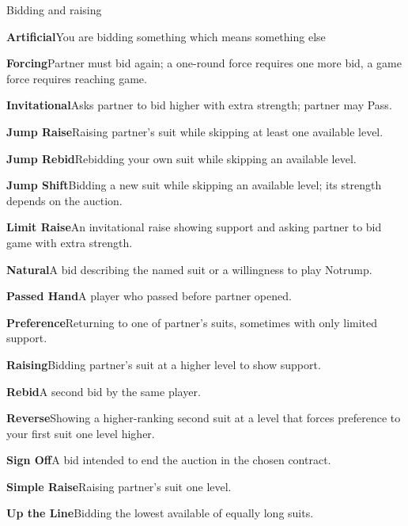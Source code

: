 \documentclass[10pt,letterpaper]{article}
\newcommand{\entry}[2]{\par\noindent\textbf{#1}\enspace #2\par\vspace{4.5pt}}
\begin{document}
\begin{minipage}[t]{0.485\textwidth}\vspace{0pt}

\begin{guidecard}{Bidding and raising}
\entry{Artificial}{You are bidding something which means something else}
\entry{Forcing}{Partner must bid again; a one-round force requires one more bid, a game force requires reaching game.}
\entry{Invitational}{Asks partner to bid higher with extra strength; partner may Pass.}
\entry{Jump Raise}{Raising partner's suit while skipping at least one available level.}
\entry{Jump Rebid}{Rebidding your own suit while skipping an available level.}
\entry{Jump Shift}{Bidding a new suit while skipping an available level; its strength depends on the auction.}
\entry{Limit Raise}{An invitational raise showing support and asking partner to bid game with extra strength.}
\entry{Natural}{A bid describing the named suit or a willingness to play Notrump.}
\entry{Passed Hand}{A player who passed before partner opened.}
\entry{Preference}{Returning to one of partner's suits, sometimes with only limited support.}
\entry{Raising}{Bidding partner's suit at a higher level to show support.}
\entry{Rebid}{A second bid by the same player.}
\entry{Reverse}{Showing a higher-ranking second suit at a level that forces preference to your first suit one level higher.}
\entry{Sign Off}{A bid intended to end the auction in the chosen contract.}
\entry{Simple Raise}{Raising partner's suit one level.}
\entry{Up the Line}{Bidding the lowest available of equally long suits.}
\end{guidecard}

\end{minipage}
\end{document}
